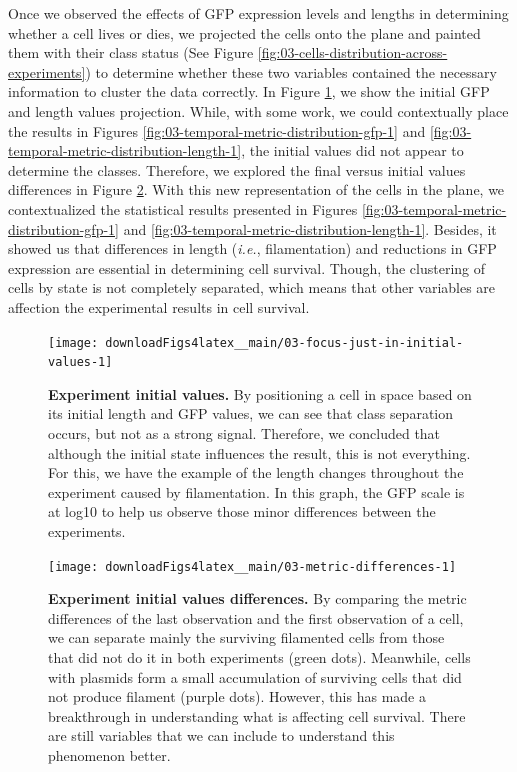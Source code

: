 \documentclass[a4paper, nobind]{templates/ociamthesis}
\begin{document}
Once we observed the effects of GFP expression levels and lengths in determining whether a cell lives or dies, we projected the cells onto the plane and painted them with their class status (See Figure \ref{fig:03-cells-distribution-across-experiments}) to determine whether these two variables contained the necessary information to cluster the data correctly.
In Figure \ref{fig:03-focus-just-in-initial-values-1}, we show the initial GFP and length values projection.
While, with some work, we could contextually place the results in Figures \ref{fig:03-temporal-metric-distribution-gfp-1} and \ref{fig:03-temporal-metric-distribution-length-1}, the initial values did not appear to determine the classes.
Therefore, we explored the final versus initial values differences in Figure \ref{fig:03-metric-differences-1}.
With this new representation of the cells in the plane, we contextualized the statistical results presented in Figures \ref{fig:03-temporal-metric-distribution-gfp-1} and \ref{fig:03-temporal-metric-distribution-length-1}.
Besides, it showed us that differences in length (\emph{i.e.}, filamentation) and reductions in GFP expression are essential in determining cell survival.
Though, the clustering of cells by state is not completely separated, which means that other variables are affection the experimental results in cell survival.





\begin{figure}[H]
\texttt{[image: downloadFigs4latex\_\_main/03-focus-just-in-initial-values-1]} \caption[Experiment initial values.]{\textbf{Experiment initial values.} By positioning a cell in space based on its initial length and GFP values, we can see that class separation occurs, but not as a strong signal. Therefore, we concluded that although the initial state influences the result, this is not everything. For this, we have the example of the length changes throughout the experiment caused by filamentation. In this graph, the GFP scale is at log10 to help us observe those minor differences between the experiments.}\label{fig:03-focus-just-in-initial-values-1}
\end{figure}





\begin{figure}[H]
\texttt{[image: downloadFigs4latex\_\_main/03-metric-differences-1]} \caption[Experiment initial values differences.]{\textbf{Experiment initial values differences.} By comparing the metric differences of the last observation and the first observation of a cell, we can separate mainly the surviving filamented cells from those that did not do it in both experiments (green dots). Meanwhile, cells with plasmids form a small accumulation of surviving cells that did not produce filament (purple dots). However, this has made a breakthrough in understanding what is affecting cell survival. There are still variables that we can include to understand this phenomenon better.}\label{fig:03-metric-differences-1}
\end{figure}
\end{document}
